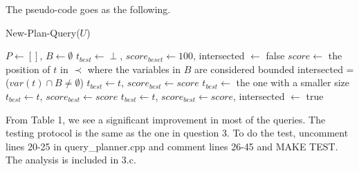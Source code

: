 \documentclass{article}
\begin{document}
\begin{enumerate}
\begin{enumerate}
The pseudo-code goes as the following. 

\begin{algorithm}[H]
\caption{New-Plan-Query($U$)}\label{alg:greedy}
\begin{algorithmic}

\State $P \leftarrow []$, $B\leftarrow \emptyset$
\State $t_{best}\leftarrow \perp$, $score_{beset} \leftarrow 100$, intersected $\leftarrow$ false
\State $score \leftarrow$ the position of $t$ in $\prec$ where the variables in $B$ are considered bounded
\State intersected = ($var(t) \cap B \neq \emptyset$)
\State $t_{best} \leftarrow t$, $score_{best} \leftarrow score$
\EndIf
{}
\State $t_{best}\leftarrow$ the one with a smaller size
\EndIf
{}
\State $t_{best} \leftarrow t$, $score_{best} \leftarrow score$
\EndIf
\Else
{} 
\State $t_{best} \leftarrow t$, $score_{best} \leftarrow score$, intersected $\leftarrow$ true
\EndIf
\EndIf

\EndFor
\EndWhile

\end{algorithmic}
\end{algorithm}


From Table 1, we see a significant improvement in most of the queries. The testing protocol is the same as the one in question 3. To do the test, uncomment lines 20-25 in query\_planner.cpp and comment lines 26-45 and MAKE TEST. The analysis is included in 3.c.


\end{enumerate}
\end{enumerate}
\end{document}
